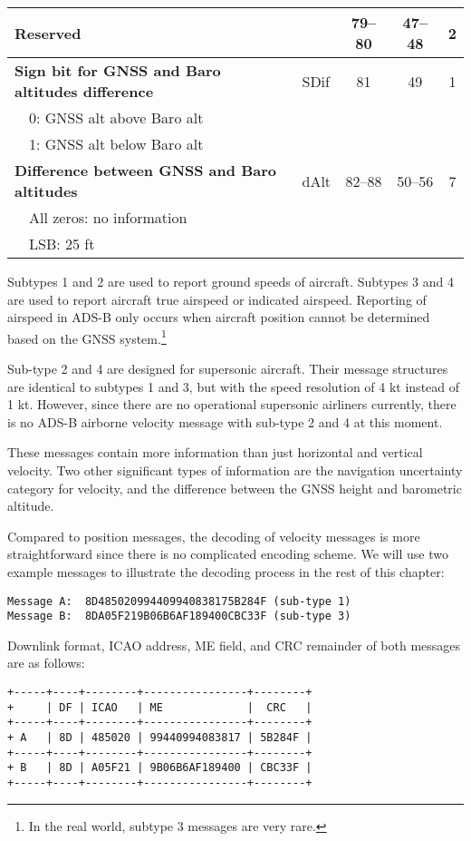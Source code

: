 \begin{table}[ht]
\begin{tabular}{|l|l|c|c|c|}
\textbf{Reserved} &  & 79--80 & 47--48 & 2 \\ \hline
\textbf{Sign bit for GNSS and Baro altitudes difference} & SDif & 81 & 49 & 1\\
~~0: GNSS alt above Baro alt &&&& \\
~~1: GNSS alt below Baro alt &&&& \\ \hline
\textbf{Difference between GNSS and Baro altitudes} & dAlt & 82--88 & 50--56 & 7\\
~~All zeros: no information &&&&\\
~~LSB: 25 ft &&&& \\ \hline
\end{tabular}
\end{table}

Subtypes 1 and 2 are used to report ground speeds of aircraft. Subtypes 3 and 4 are used to report aircraft true airspeed or indicated airspeed. Reporting of airspeed in ADS-B only occurs when aircraft position cannot be determined based on the GNSS system.\footnote{In the real world, subtype 3 messages are very rare.} 

Sub-type 2 and 4 are designed for supersonic aircraft. Their message structures are identical to subtypes 1 and 3, but with the speed resolution of 4 kt instead of 1 kt. However, since there are no operational supersonic airliners currently, there is no ADS-B airborne velocity message with sub-type 2 and 4 at this moment.

These messages contain more information than just horizontal and vertical velocity. Two other significant types of information are the navigation uncertainty category for velocity, and the difference between the GNSS height and barometric altitude. 

Compared to position messages, the decoding of velocity messages is more straightforward since there is no complicated encoding scheme. We will use two example messages to illustrate the decoding process in the rest of this chapter:

\begin{verbatim}
Message A:  8D485020994409940838175B284F (sub-type 1)
Message B:  8DA05F219B06B6AF189400CBC33F (sub-type 3)
\end{verbatim}

Downlink format, ICAO address, ME field, and CRC remainder of both messages are as follows:

\begin{verbatim}
+-----+----+--------+----------------+--------+
+     | DF | ICAO   | ME             |  CRC   |
+-----+----+--------+----------------+--------+
+ A   | 8D | 485020 | 99440994083817 | 5B284F |
+-----+----+--------+----------------+--------+
+ B   | 8D | A05F21 | 9B06B6AF189400 | CBC33F |
+-----+----+--------+----------------+--------+
\end{verbatim}

